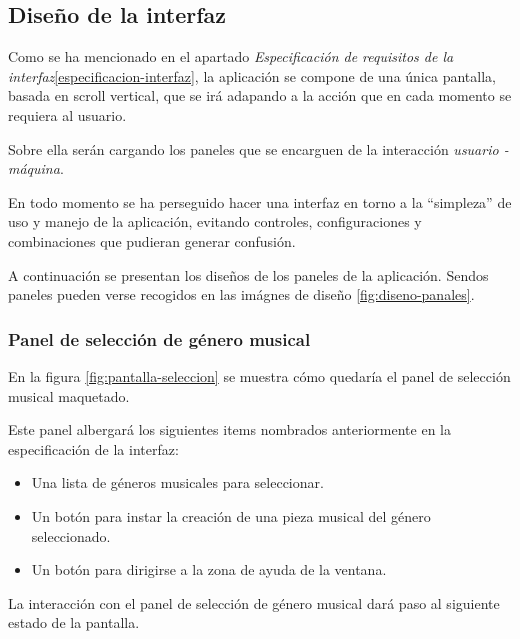 \subsection{Diseño de la interfaz}

Como se ha mencionado en el apartado \emph{Especificación de requisitos de la interfaz}\ref{especificacion-interfaz}, la aplicación se compone de una única pantalla, basada en scroll vertical, que se irá adapando a la acción que en cada momento se requiera al usuario.

Sobre ella serán cargando los paneles que se encarguen de la interacción \emph{usuario - máquina}.

En todo momento se ha perseguido hacer una interfaz en torno a la ``simpleza'' de uso y manejo de la aplicación, evitando controles, configuraciones y combinaciones que pudieran generar confusión.

A continuación se presentan los diseños de los paneles de la aplicación. Sendos paneles pueden verse recogidos en las imágnes de diseño \ref{fig:diseno-panales}.

\subsubsection{Panel de selección de género musical}

En la figura \ref{fig:pantalla-seleccion} se muestra cómo quedaría el panel de selección musical maquetado.


Este panel albergará los siguientes items nombrados anteriormente en la especificación de la interfaz:

\begin{itemize}
    \item Una lista de géneros musicales para seleccionar.
    \item Un botón para instar la creación de una pieza musical del género seleccionado.
    \item Un botón para dirigirse a la zona de ayuda de la ventana.
\end{itemize}

La interacción con el panel de selección de género musical dará paso al siguiente estado de la pantalla.

